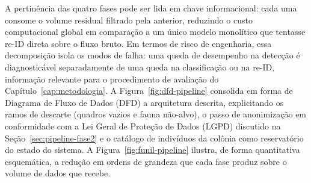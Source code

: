 A pertinência das quatro fases pode ser lida em chave informacional: cada uma consome o volume residual filtrado pela anterior, reduzindo o custo computacional global em comparação a um único modelo monolítico que tentasse re-ID direta sobre o fluxo bruto. Em termos de risco de engenharia, essa decomposição isola os modos de falha: uma queda de desempenho na detecção é diagnosticável separadamente de uma queda na classificação ou na re-ID, informação relevante para o procedimento de avaliação do Capítulo~\ref{cap:metodologia}. A Figura~\ref{fig:dfd-pipeline} consolida em forma de Diagrama de Fluxo de Dados (DFD) a arquitetura descrita, explicitando os ramos de descarte (quadros vazios e fauna não-alvo), o passo de anonimização em conformidade com a Lei Geral de Proteção de Dados (LGPD) discutido na Seção~\ref{sec:pipeline-fase2} e o catálogo de indivíduos da colônia como reservatório do estado do sistema. A Figura~\ref{fig:funil-pipeline} ilustra, de forma quantitativa esquemática, a redução em ordens de grandeza que cada fase produz sobre o volume de dados que recebe.



